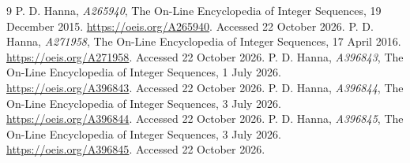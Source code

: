 \documentclass[11pt,a4paper]{article}
\theoremstyle{remark}
\begin{document}
\begin{thebibliography}{9}
 P. D. Hanna, \emph{A265940}, The On-Line Encyclopedia of
Integer Sequences, 19 December 2015. \url{https://oeis.org/A265940}.
Accessed 22 October 2026.
 P. D. Hanna, \emph{A271958}, The On-Line Encyclopedia of
Integer Sequences, 17 April 2016. \url{https://oeis.org/A271958}.
Accessed 22 October 2026.
 P. D. Hanna, \emph{A396843}, The On-Line Encyclopedia of
Integer Sequences, 1 July 2026. \url{https://oeis.org/A396843}.
Accessed 22 October 2026.
 P. D. Hanna, \emph{A396844}, The On-Line Encyclopedia of
Integer Sequences, 3 July 2026. \url{https://oeis.org/A396844}.
Accessed 22 October 2026.
 P. D. Hanna, \emph{A396845}, The On-Line Encyclopedia of
Integer Sequences, 3 July 2026. \url{https://oeis.org/A396845}.
Accessed 22 October 2026.
\end{thebibliography}
\end{document}
